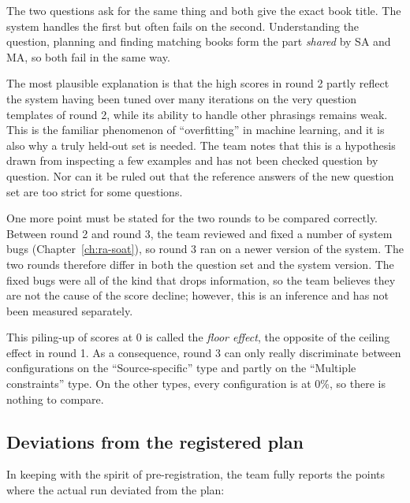 The two questions ask for the same thing and both give the exact book title. The system handles the first but often fails on the second. Understanding the question, planning and finding matching books form the part \emph{shared} by SA and MA, so both fail in the same way.

The most plausible explanation is that the high scores in round 2 partly reflect the system having been tuned over many iterations on the very question templates of round 2, while its ability to handle other phrasings remains weak. This is the familiar phenomenon of ``overfitting'' in machine learning, and it is also why a truly held-out set is needed. The team notes that this is a hypothesis drawn from inspecting a few examples and has not been checked question by question. Nor can it be ruled out that the reference answers of the new question set are too strict for some questions.

One more point must be stated for the two rounds to be compared correctly. Between round 2 and round 3, the team reviewed and fixed a number of system bugs (Chapter~\ref{ch:ra-soat}), so round 3 ran on a newer version of the system. The two rounds therefore differ in both the question set and the system version. The fixed bugs were all of the kind that drops information, so the team believes they are not the cause of the score decline; however, this is an inference and has not been measured separately.

This piling-up of scores at 0 is called the \emph{floor effect}, the opposite of the ceiling effect in round 1. As a consequence, round 3 can only really discriminate between configurations on the ``Source-specific'' type and partly on the ``Multiple constraints'' type. On the other types, every configuration is at 0\%, so there is nothing to compare.

\subsection{Deviations from the registered plan}

In keeping with the spirit of pre-registration, the team fully reports the points where the actual run deviated from the plan:

